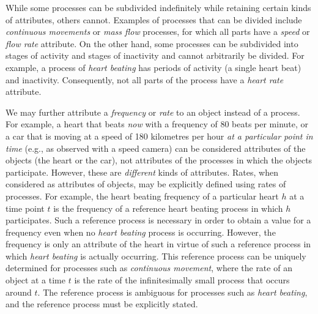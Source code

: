 \documentclass[12pt]{article}
\begin{document}
While some processes can be subdivided indefinitely while retaining
certain kinds of attributes, others cannot.
Examples of processes that can be divided include {\em continuous
  movements} or {\em mass flow} processes, for which all parts have a
{\em speed} or {\em flow rate} attribute. On the other hand, some
processes can be subdivided into stages of activity and stages of
inactivity and cannot arbitrarily be divided. For example, a process
of {\em heart beating} has periods of activity (a single heart beat)
and inactivity. Consequently, not all parts of the process have a {\em
  heart rate} attribute.

We may further attribute a {\em frequency} or {\em rate} to an object
instead of a process. For example, a heart that beats {\em now} with a
frequency of 80 beats per minute, or a car that is moving at a speed
of 180 kilometres per hour {\em at a particular point in time} (e.g.,
as observed with a speed camera) can be considered attributes of the
objects (the heart or the car), not attributes of the processes in
which the objects participate. However, these are {\em different}
kinds of attributes. Rates, when considered as attributes of objects,
may be explicitly defined using rates of processes. For example, the
heart beating frequency of a particular heart $h$ at a time point $t$
is the frequency of a reference heart beating process in which $h$
participates. Such a reference process is necessary in order to obtain
a value for a frequency even when no {\em heart beating} process is
occurring. However, the frequency is only an attribute of the heart in
virtue of such a reference process in which {\em heart beating} is
actually occurring.  This reference process can be uniquely determined
for processes such as {\em continuous movement}, where the rate of an
object at a time $t$ is the rate of the infinitesimally small process
that occurs around $t$. The reference process is ambiguous for
processes such as {\em heart beating}, and the reference process must
be explicitly stated.


\end{document}

